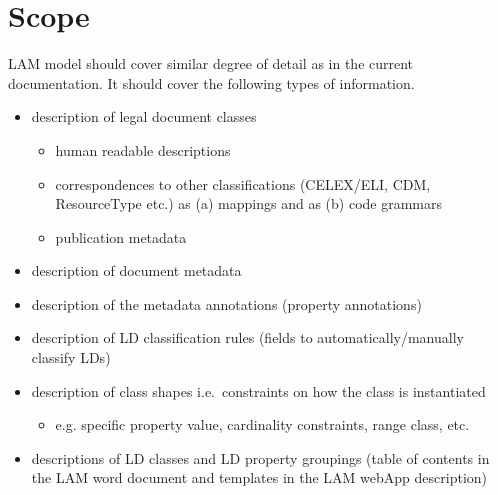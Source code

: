 \hypertarget{ariaid-title1}{%
\section{Scope}\label{ariaid-title1}}

LAM model should cover similar degree of detail as in the current
documentation. It should cover the following types of information.

\begin{itemize}
\tightlist
\item
  description of legal document classes

  \begin{itemize}
  \tightlist
  \item
    human readable descriptions
  \item
    correspondences to other classifications (CELEX/ELI, CDM,
    ResourceType etc.) as (a) mappings and as (b) code grammars
  \item
    publication metadata
  \end{itemize}
\item
  description of document metadata
\item
  description of the metadata annotations (property annotations)
\item
  description of LD classification rules (fields to
  automatically/manually classify LDs)
\item
  description of class shapes i.e.~constraints on how the class is
  instantiated

  \begin{itemize}
  \tightlist
  \item
    e.g. specific property value, cardinality constraints, range class,
    etc.
  \end{itemize}
\item
  descriptions of LD classes and LD property groupings (table of
  contents in the LAM word document and templates in the LAM webApp
  description)
\end{itemize}
